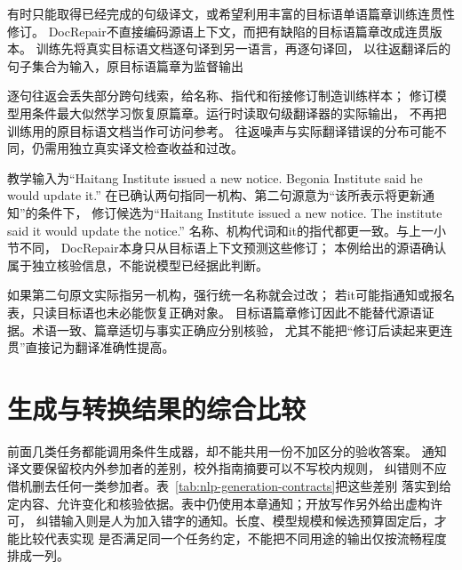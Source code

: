 有时只能取得已经完成的句级译文，或希望利用丰富的目标语单语篇章训练连贯性修订。
DocRepair不直接编码源语上下文，而把有缺陷的目标语篇章改成连贯版本。
训练先将真实目标语文档逐句译到另一语言，再逐句译回，
以往返翻译后的句子集合为输入，原目标语篇章为监督输出

逐句往返会丢失部分跨句线索，给名称、指代和衔接修订制造训练样本；
修订模型用条件最大似然学习恢复原篇章。运行时读取句级翻译器的实际输出，
不再把训练用的原目标语文档当作可访问参考。
往返噪声与实际翻译错误的分布可能不同，仍需用独立真实译文检查收益和过改。

教学输入为“Haitang Institute issued a new notice.
Begonia Institute said he would update it.”
在已确认两句指同一机构、第二句源意为“该所表示将更新通知”的条件下，
修订候选为“Haitang Institute issued a new notice.
The institute said it would update the notice.”
名称、机构代词和it的指代都更一致。与上一小节不同，
DocRepair本身只从目标语上下文预测这些修订；
本例给出的源语确认属于独立核验信息，不能说模型已经据此判断。

如果第二句原文实际指另一机构，强行统一名称就会过改；
若it可能指通知或报名表，只读目标语也未必能恢复正确对象。
目标语篇章修订因此不能替代源语证据。术语一致、篇章适切与事实正确应分别核验，
尤其不能把“修订后读起来更连贯”直接记为翻译准确性提高。

\section{生成与转换结果的综合比较}
\label{sec:nlp-generation-comparison}

前面几类任务都能调用条件生成器，却不能共用一份不加区分的验收答案。
通知译文要保留校内外参加者的差别，校外指南摘要可以不写校内规则，
纠错则不应借机删去任何一类参加者。表~\ref{tab:nlp-generation-contracts}把这些差别
落实到给定内容、允许变化和核验依据。表中仍使用本章通知；开放写作另外给出虚构许可，
纠错输入则是人为加入错字的通知。长度、模型规模和候选预算固定后，才能比较代表实现
是否满足同一个任务约定，不能把不同用途的输出仅按流畅程度排成一列。

